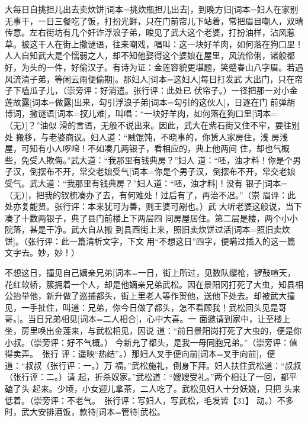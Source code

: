 \documentclass[UTF8,scheme=chinese,11pt,linespread=1.4]{ctexbook}
\makeatletter
\newcommand{\banben}[2][]{#2}
\newenvironment{diben}[1]
  {\list{}{\listparindent 2em
    \itemindent\listparindent
    \rightmargin 0em  %
    \leftmargin 0em  %
    \parsep \z@ \@plus\p@}%
   \item\relax}
  {\endlist}
\makeatother
\begin{document}
\begin{diben}
武大每日自\banben{挑担儿出去卖炊饼}[词本={挑炊瓶担儿出去}]，\banben{到晚方归}[词本={妇人在家别无事干，一日三餐吃了饭，打扮光鲜，只在门前帘儿下站着，常把眉目嘲人，双晴传意。左右街坊有几个奸诈浮浪子弟，睃见了武大这个老婆，打扮油样，沾风惹草。被这干人在街上撒谜语，往来嘲戏，唱叫：这一块好羊肉，如何落在狗口里！人人自知武大是个懦弱之人，却不知他娶得这个婆娘在屋里，风流伶俐，诸般都好，为头的一件，好偷汉子。有诗为证：金莲容貌更堪题，笑蹙春山八字眉。若遇风流清子弟，等闲云雨便偷期}]。\banben{那妇人}[词本={这妇人}]每日打发武
大出门，只在帘子下嗑瓜子儿，（崇旁评：好消遣。张行评：此处已
伏帘子。）一径把那一对小金莲\banben{故露}[词本={做露}]出来，\banben{勾引浮浪子弟}[词本={勾引的这伙人}]，日逐在门
前弹胡博词，\banben{撒谜语}[词本={扠儿难}]，\banben{叫唱：“一块好羊肉，如何落在狗口里}[词本={（无）}]？”油似
滑的言语，无般不说出来。因此，武大在紫石街又住不牢，要往别处
搬移，与老婆商议。妇人道：“贼馄饨，不晓事的，你赁人家房住，浅
房浅屋，可知有小人啰唣！不如凑几两银子，看相应的，典上他两间
住，却也气概些，免受人欺侮。”\banben{武大道：“我那里有钱典房？”妇人
道：“呸，浊才料！你是个男子汉，倒摆布不开，常交老娘受气}[词本={你是个男子汉，倒摆布不开，常交老娘受气。武大道：“我那里有钱典房？”妇人道：“呸，浊才料}]！\banben{没有
银子}[词本={（无）}]，把我的钗梳凑办了去，有何难处！过后有了，再治不迟。”（崇
眉评：此处亦复能贤。张行评：本来犹可为善，则王婆可剐也。）武
大听老婆这般说，当下凑了十数两银子，典了县门前楼上下两层四
间房屋居住。第二层是楼，两个小小院落，甚是干净。武大自从搬
到县西街上来，\banben{照旧卖炊饼过活}[词本={照旧卖炊饼}]。（张行评：此一篇清析文字，下文
用“不想这日”四字，便瞒过插入的这一篇文字去。妙，妙！）

\banben{不想这日，撞见自己嫡亲兄弟}[词本={一日，街上所过，见数队缨枪，锣鼓喧天，花红软轿，簇拥着一个人，却是他嫡亲兄弟武松。因在景阳冈打死了大虫，知县相公抬举他，新升做了巡捕都头，街上里老人等作贺他，送他下处去。却被武大撞见，一手扯住，叫道：兄弟，你今日做了都头，怎不看顾我！武松回头见是哥哥。}]。\banben{当日兄弟相见}[词本={二人相合}]，心中大喜。一
面邀请到家中，让至楼上坐，房里唤出金莲来，与武松相见，因说
道：“前日景阳岗打死了大虫的，便是你小叔。（崇旁评：好不气概。）
今新充了都头，是我一母同胞兄弟。”（崇旁评：值得卖弄。　张行
评：遥映“热结”。）那妇人\banben{叉手便向前}[词本={叉手向前}]，便道：“叔叔（张行评：一。）万
福。”武松施礼，倒身下拜。妇人扶住武松道：“叔叔（张行评：二。）请
起，折杀奴家。”武松道：“嫂嫂受礼。”两个相让了一回，都平磕了头
起来。少顷，小女迎儿拿茶，二人吃了。武松见妇人十分妖娆，只把
头来低着。（崇旁评：不老气。　张行评：写妇人，写武松，毛发皆【31】
动。）不多时，武大安排酒饭，\banben{款待}[词本={管待}]武松。


\end{diben}
\end{document}
